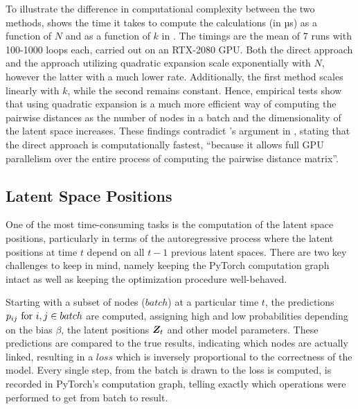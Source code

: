     To illustrate the difference in computational complexity between the two methods,  shows the time it takes to compute the calculations (in µs) as a function of $N$ and as a function of $k$ in . The timings are the mean of 7 runs with 100-1000 loops each, carried out on an RTX-2080 GPU. Both the direct approach and the approach utilizing quadratic expansion scale exponentially with $N$, however the latter with a much lower rate. Additionally, the first method scales linearly with $k$, while the second remains constant. Hence, empirical tests show that using quadratic expansion is a much more efficient way of computing the pairwise distances as the number of nodes in a batch and the dimensionality of the latent space increases. These findings contradict \citeauthor{jacobsen2018a}'s argument in \cite{jacobsen2018a}, stating that the direct approach is computationally fastest, ``because it allows full GPU parallelism over the entire process of computing the pairwise distance matrix''.
    
\subsection{Latent Space Positions}\label{sec:pyimpl-positions}

    One of the most time-consuming tasks is the computation of the latent space positions, particularly in terms of the autoregressive process where the latent positions at time $t$ depend on all $t-1$ previous latent spaces.
    There are two key challenges to keep in mind, namely keeping the PyTorch computation graph intact as well as keeping the optimization procedure well-behaved. 
    
    Starting with a subset of nodes ($batch$) at a particular time $t$, the predictions $\sub(p)\text{ for } i,j \in batch$ are computed, assigning high and low probabilities depending on the bias $\beta$, the latent positions $\bm{Z}_t$ and other model parameters. These predictions are compared to the true results, indicating which nodes are actually linked, resulting in a $loss$ which is inversely proportional to the correctness of the model. Every single step, from the batch is drawn to the loss is computed, is recorded in PyTorch's computation graph, telling exactly which operations were performed to get from batch to result. 
    
